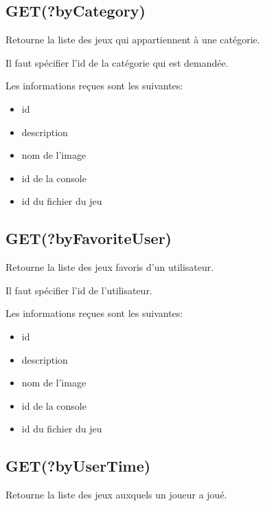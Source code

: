 \documentclass[a4paper,12pt,french]{sphinxmanual}
\begin{document}
\subsection{GET(?byCategory)}
\label{\detokenize{fonctionnelle:get-bycategory}}
\sphinxAtStartPar
Retourne la liste des jeux qui appartiennent à une catégorie.

\sphinxAtStartPar
Il faut spécifier l’id de la catégorie qui est demandée.

\sphinxAtStartPar
Les informations reçues sont les suivantes:
\begin{itemize}
\item {} 
\sphinxAtStartPar
id

\item {} 
\sphinxAtStartPar
description

\item {} 
\sphinxAtStartPar
nom de l’image

\item {} 
\sphinxAtStartPar
id de la console

\item {} 
\sphinxAtStartPar
id du fichier du jeu

\end{itemize}


\subsection{GET(?byFavoriteUser)}
\label{\detokenize{fonctionnelle:get-byfavoriteuser}}
\sphinxAtStartPar
Retourne la liste des jeux favoris d’un utilisateur.

\sphinxAtStartPar
Il faut spécifier l’id de l’utilisateur.

\sphinxAtStartPar
Les informations reçues sont les suivantes:
\begin{itemize}
\item {} 
\sphinxAtStartPar
id

\item {} 
\sphinxAtStartPar
description

\item {} 
\sphinxAtStartPar
nom de l’image

\item {} 
\sphinxAtStartPar
id de la console

\item {} 
\sphinxAtStartPar
id du fichier du jeu

\end{itemize}


\subsection{GET(?byUserTime)}
\label{\detokenize{fonctionnelle:get-byusertime}}
\sphinxAtStartPar
Retourne la liste des jeux auxquels un joueur a joué.
\end{document}
